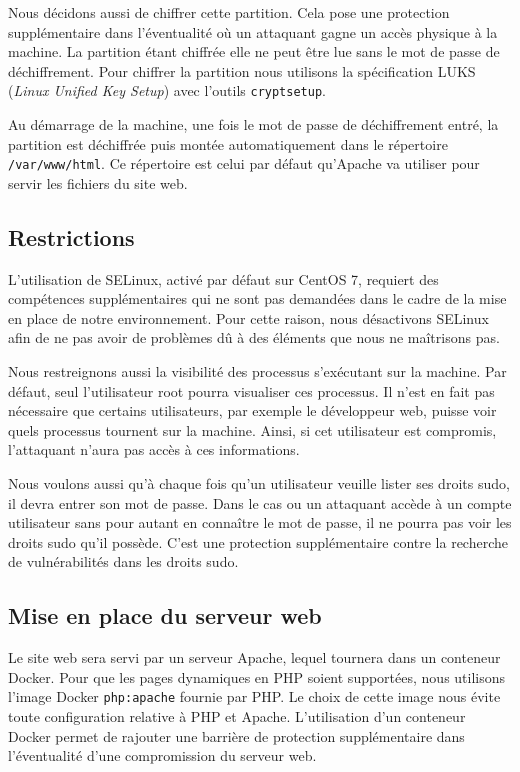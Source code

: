 \documentclass{extarticle} %
\begin{document}
     Nous décidons aussi de chiffrer cette partition. Cela pose une protection supplémentaire dans l'éventualité
      où un attaquant gagne un accès physique à la machine. La partition étant chiffrée elle ne peut être lue sans
       le mot de passe de déchiffrement. Pour chiffrer la partition nous utilisons la spécification LUKS 
       (\textit{Linux Unified Key Setup}) avec l'outils \texttt{cryptsetup}.

     Au démarrage de la machine, une fois le mot de passe de déchiffrement entré, 
     la partition est déchiffrée puis montée automatiquement dans le répertoire \texttt{/var/www/html}.
      Ce répertoire est celui par défaut qu'Apache va utiliser pour servir les fichiers du site web.

     \subsection{Restrictions}

     L'utilisation de SELinux, activé par défaut sur CentOS 7, requiert des compétences supplémentaires qui
      ne sont pas demandées dans le cadre de la mise en place de notre environnement. Pour cette raison, nous
       désactivons SELinux afin de ne pas avoir de problèmes dû à des éléments que nous ne maîtrisons pas.

     Nous restreignons aussi la visibilité des processus s'exécutant sur la machine. Par défaut, seul 
     l'utilisateur root pourra visualiser ces processus. Il n'est en fait pas nécessaire que certains
      utilisateurs, par exemple le développeur web, puisse voir quels processus tournent sur la machine.
       Ainsi, si cet utilisateur est compromis, l'attaquant n'aura pas accès à ces informations.

     Nous voulons aussi qu'à chaque fois qu'un utilisateur veuille lister ses droits sudo, il devra 
     entrer son mot de passe. Dans le cas ou un attaquant accède à un compte utilisateur sans pour 
     autant en connaître le mot de passe, il ne pourra pas voir les droits sudo qu'il possède. C'est 
     une protection supplémentaire contre la recherche de vulnérabilités dans les droits sudo.

     \subsection{Mise en place du serveur web}

     Le site web sera servi par un serveur Apache, lequel tournera dans un conteneur Docker. Pour que 
     les pages dynamiques en PHP soient supportées, nous utilisons l’image Docker \texttt{php:apache} 
     fournie par PHP. Le choix de cette image nous évite toute configuration relative à PHP et Apache. 
     L'utilisation d'un conteneur Docker permet de rajouter une barrière de protection supplémentaire 
     dans l'éventualité d'une compromission du serveur web.
\end{document}
